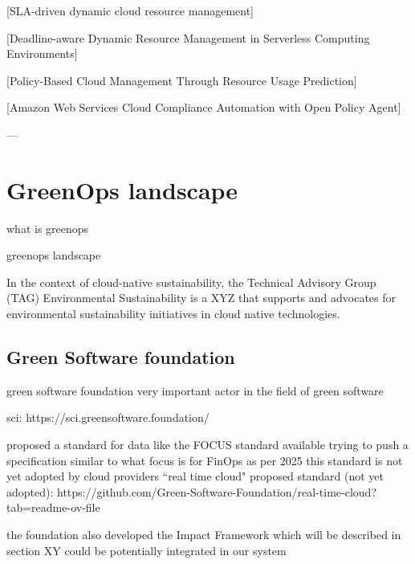 [SLA-driven dynamic cloud resource management]

[Deadline-aware Dynamic Resource Management in Serverless Computing Environments]

[Policy-Based Cloud Management Through Resource Usage Prediction]

[Amazon Web Services Cloud Compliance Automation with Open Policy Agent]


---


\section{GreenOps landscape}

what is greenops

greenops landscape 

In the context of cloud-native sustainability,
the Technical Advisory Group (TAG) Environmental Sustainability is a XYZ that supports and advocates for environmental sustainability initiatives in cloud native technologies.



\subsection{Green Software foundation}

green software foundation
very important actor in the field of green software

sci: https://sci.greensoftware.foundation/

proposed a standard for data like the FOCUS standard available 
trying to push a specification similar to what focus is for FinOps
as per 2025 this standard is not yet adopted by cloud providers
``real time cloud" proposed standard (not yet adopted): https://github.com/Green-Software-Foundation/real-time-cloud?tab=readme-ov-file

the foundation also developed the Impact Framework which will be described in section XY
could be potentially integrated in our system

